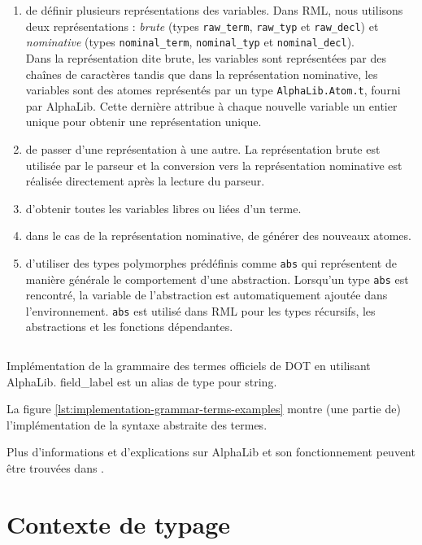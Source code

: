\begin{enumerate}
  \item de définir plusieurs représentations des variables. Dans RML, nous utilisons deux
  représentations : \textit{brute} (types \verb|raw_term|,
  \verb|raw_typ| et \verb|raw_decl|) et \textit{nominative}
  (types \verb|nominal_term|, \verb|nominal_typ| et \verb|nominal_decl|). \\Dans la
  représentation dite brute, les variables sont représentées par des chaînes de
  caractères tandis que dans la représentation nominative, les variables sont
  des atomes représentés par un type \verb|AlphaLib.Atom.t|, fourni par
  AlphaLib. Cette dernière attribue à chaque nouvelle variable un entier
  unique pour obtenir une représentation unique.
\item de passer d'une représentation à une autre. La représentation brute est
  utilisée par le parseur et la conversion vers la représentation nominative est
  réalisée directement après la lecture du parseur.
\item d'obtenir toutes les variables libres ou liées d'un terme.
\item dans le cas de la représentation nominative, de générer des nouveaux atomes.
\item d'utiliser des types polymorphes prédéfinis comme \verb|abs| qui représentent de manière générale
  le comportement d'une abstraction. Lorsqu'un type \verb|abs|
  est rencontré, la variable de l'abstraction est automatiquement ajoutée dans
  l'environnement. \verb|abs| est utilisé dans RML pour les types récursifs,
  les abstractions et les fonctions dépendantes.
\end{enumerate}

\begin{listing}
  \inputminted{OCaml}{codes/grammar.ml}
  \caption{Implémentation de la grammaire des termes officiels de DOT en
    utilisant AlphaLib. field\_label est un alias de type pour string.}
  \label{lst:implementation-grammar-terms-examples}
\end{listing}

La figure \ref{lst:implementation-grammar-terms-examples} montre (une partie de)
l'implémentation de la syntaxe abstraite des termes.

Plus d'informations et d'explications sur AlphaLib et son fonctionnement peuvent
être trouvées dans \cite{alphalib-paper}.

\section{Contexte de typage}


